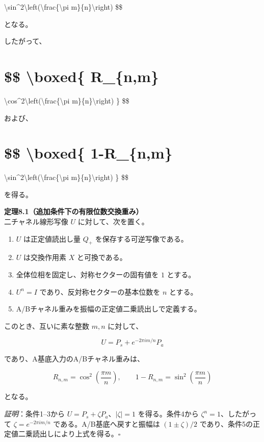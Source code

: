 \documentclass[
  a4paper,
  10pt]{article}
\providecommand{\tightlist}{%
  \setlength{\itemsep}{0pt}\setlength{\parskip}{0pt}}
\begin{document}
\textbackslash sin\^{}2\textbackslash left(\textbackslash frac\{\textbackslash pi
m\}\{n\}\textbackslash right) \$\$

となる。

したがって、

\section{\$\$ \textbackslash boxed\{ R\_\{n,m\}}\label{-boxed-r_nm}

\textbackslash cos\^{}2\textbackslash left(\textbackslash frac\{\textbackslash pi
m\}\{n\}\textbackslash right) \} \$\$

および、

\section{\$\$ \textbackslash boxed\{ 1-R\_\{n,m\}}\label{-boxed-1-r_nm}

\textbackslash sin\^{}2\textbackslash left(\textbackslash frac\{\textbackslash pi
m\}\{n\}\textbackslash right) \} \$\$

を得る。

\textbf{定理8.1（追加条件下の有限位数交換重み）}\\
二チャネル線形写像 \(U\) に対して、次を置く。

\begin{enumerate}
\def\labelenumi{\arabic{enumi}.}
\tightlist
\item
  \(U\) は正定値読出し量 \(Q_+\) を保存する可逆写像である。
\item
  \(U\) は交換作用素 \(X\) と可換である。
\item
  全体位相を固定し、対称セクターの固有値を \(1\) とする。
\item
  \(U^n=I\) であり、反対称セクターの基本位数を \(n\) とする。
\item
  A/Bチャネル重みを振幅の正定値二乗読出しで定義する。
\end{enumerate}

このとき、互いに素な整数 \(m,n\) に対して、

\[
U=P_s+e^{-2\pi im/n}P_a
\]

であり、A基底入力のA/Bチャネル重みは、

\[
\boxed{
R_{n,m}=\cos^2\left(\frac{\pi m}{n}\right),
\qquad
1-R_{n,m}=\sin^2\left(\frac{\pi m}{n}\right)
}
\]

となる。

\emph{証明}：条件1--3から \(U=P_s+\zeta P_a\)、\(|\zeta|=1\)
を得る。条件4から \(\zeta^n=1\)、したがって \(\zeta=e^{-2\pi im/n}\)
である。A/B基底へ戻すと振幅は \((1\pm\zeta)/2\)
であり、条件5の正定値二乗読出しにより上式を得る。\(\square\)
\end{document}
